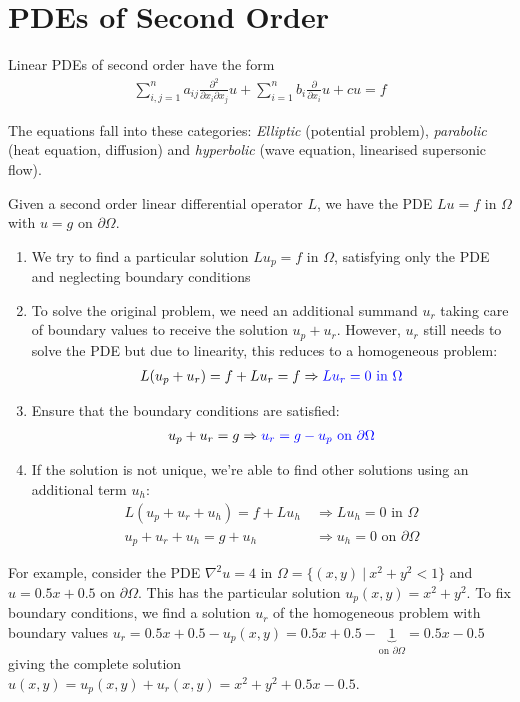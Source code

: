 \section{PDEs of Second Order}

Linear PDEs of second order have the form
\begin{align*}
	\sum_{i,j=1}^n a_{ij}\frac{\partial ^2}{\partial x_i\partial x_j}u+\sum_{i=1}^nb_i\frac{\partial}{\partial x_i}u + cu = f
\end{align*}

The equations fall into these categories:
\emph{Elliptic} (potential problem), \emph{parabolic} (heat equation, diffusion)
and \emph{hyperbolic} (wave equation, linearised supersonic flow).


Given a second order linear differential operator $L$,
we have the PDE $Lu = f \text{ in }\Omega$ with $u = g \text{ on }\partial\Omega$.

\begin{enumerate}
	\item We try to find a particular solution {\color{blue}$Lu_p = f$ in $\Omega$}, satisfying only the PDE and neglecting boundary conditions
	\item{
		To solve the original problem,
		we need an additional summand $u_r$ taking care of boundary values to receive the solution $u_p + u_r$.
		However, $u_r$ still needs to solve the PDE but due to linearity, this reduces to a homogeneous problem:
		\begin{align*}
			L(u_p + u_r) = f + Lu_r = f \Rightarrow{\color{blue} Lu_r = 0\text{ in }\Omega}
		\end{align*}
	}
	\item{
		Ensure that the boundary conditions are satisfied:
		\begin{align*}
			u_p+u_r = g \Rightarrow {\color{blue}u_r = g - u_p\text{ on }\partial\Omega}
		\end{align*}
	}
	\item{
		If the solution is not unique, we're able to find other solutions using an additional term $u_h$:
		\begin{align*}
			L(u_p + u_r + u_h) = f + Lu_h &\ \Rightarrow Lu_h = 0\text{ in }\Omega \\
			u_p + u_r + u_h = g + u_h &\ \Rightarrow u_h = 0\text{ on }\partial\Omega
		\end{align*}
	}
\end{enumerate}

For example, consider the PDE $\nabla^2 u = 4$ in $\Omega = \{(x,y)\ |\ x^2 + y^2 < 1\}$ and $u = 0.5x+0.5$ on $\partial\Omega$.
This has the particular solution $u_p(x,y)=x^2+y^2$.
To fix boundary conditions, we find a solution $u_r$ of the homogeneous problem with boundary values
$u_r = 0.5x + 0.5 - u_p(x,y) = 0.5x + 0.5 - \underbrace{1}_{\text{on }\partial\Omega} = 0.5x - 0.5$ giving the complete solution
$u(x,y) = u_p(x,y) + u_r(x,y) = x^2 + y^2 + 0.5x - 0.5$.
